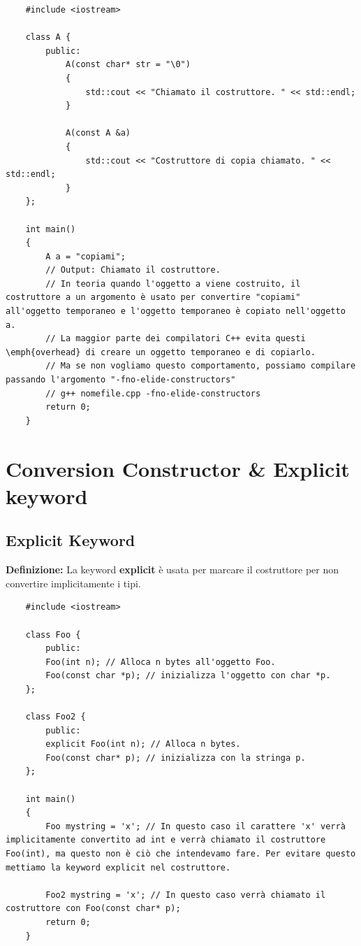 \begin{lstlisting}
	#include <iostream>
	
	class A {
		public:
			A(const char* str = "\0")
			{
				std::cout << "Chiamato il costruttore. " << std::endl;
			}
		
			A(const A &a)
			{
				std::cout << "Costruttore di copia chiamato. " << std::endl;
			}
	};

	int main()
	{
		A a = "copiami";
		// Output: Chiamato il costruttore.
		// In teoria quando l'oggetto a viene costruito, il costruttore a un argomento è usato per convertire "copiami" all'oggetto temporaneo e l'oggetto temporaneo è copiato nell'oggetto a.
		// La maggior parte dei compilatori C++ evita questi \emph{overhead} di creare un oggetto temporaneo e di copiarlo.
		// Ma se non vogliamo questo comportamento, possiamo compilare passando l'argomento "-fno-elide-constructors"
		// g++ nomefile.cpp -fno-elide-constructors
		return 0;
	}
\end{lstlisting}


\section{Conversion Constructor \& Explicit keyword}  %

\subsection{Explicit Keyword}

\textsf{\small \textbf{Definizione: } La keyword \textbf{explicit} è usata per marcare il costruttore per non convertire implicitamente i tipi.} \\

\begin{lstlisting}
	#include <iostream>
	
	class Foo {
		public:
		Foo(int n); // Alloca n bytes all'oggetto Foo.
		Foo(const char *p); // inizializza l'oggetto con char *p.
	};
	
	class Foo2 {
		public:
		explicit Foo(int n); // Alloca n bytes.
		Foo(const char* p); // inizializza con la stringa p.
	};
	
	int main()
	{
		Foo mystring = 'x'; // In questo caso il carattere 'x' verrà implicitamente convertito ad int e verrà chiamato il costruttore Foo(int), ma questo non è ciò che intendevamo fare. Per evitare questo mettiamo la keyword explicit nel costruttore.
		
		Foo2 mystring = 'x'; // In questo caso verrà chiamato il costruttore con Foo(const char* p);
		return 0;
	}
\end{lstlisting}

